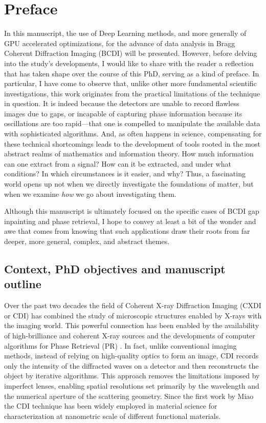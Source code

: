 \section{Preface}\label{chp:intro}

In this manuscript, the use of Deep Learning methods, and more generally of GPU accelerated optimizations, for the advance of 
data analysis in Bragg Coherent Diffraction Imaging (BCDI) will be presented. However, before delving into the 
study’s developments, I would like to share with the reader a reflection that has taken shape over the course of this 
PhD, serving as a kind of preface. In particular, I have come to observe that, unlike other more fundamental 
scientific investigations, this work originates from the practical limitations of the technique in question. 
It is indeed because the detectors are unable to record flawless images due to gaps, or incapable of 
capturing phase information because its oscillations are too rapid—that one is compelled to manipulate the available 
data with sophisticated algorithms. And, as often happens in science, compensating for these technical shortcomings 
leads to the development of tools rooted in the most abstract realms of mathematics and information theory. How much 
information can one extract from a signal? How can it be extracted, and under what conditions? In which 
circumstances is it easier, and why? Thus, a fascinating world opens up not when we directly investigate the foundations 
of matter, but when we examine \textit{how} we go about investigating them. 

Although this manuscript is ultimately focused on the specific cases of BCDI gap inpainting and phase retrieval, 
I hope to convey at least a bit of the wonder and awe that comes from knowing that such applications draw their roots 
from far deeper, more general, complex, and abstract themes.

\subsection{Context, PhD objectives and manuscript outline}

Over the past two decades the field of Coherent X-ray Diffraction Imaging (CXDI or CDI) has combined the study of microscopic structures 
enabled by X-rays with the imaging world. This powerful connection has been enabled by the availability of high-brilliance and 
coherent X-ray sources and the developments of computer algorithms for Phase Retrieval (PR) \cite{fienup_reconstruction_1978, fienup_phase_1982, Luke2004}. 
In fact, unlike conventional imaging methods, 
instead of relying on high-quality optics to form an image, CDI records only the intensity of the diffracted waves on 
a detector and then reconstructs the object by iterative algorithms. 
This approach removes the limitations imposed by imperfect lenses, enabling spatial resolutions set primarily by the 
wavelength and the numerical aperture of the scattering geometry. 
Since the first work by Miao \cite{Miao1998} the CDI technique has been widely employed in material science for 
characterization at nanometric scale of different functional materials. \cite{Neutze2000, Chapman2005, Schroer2008, Rodriguez2015}

